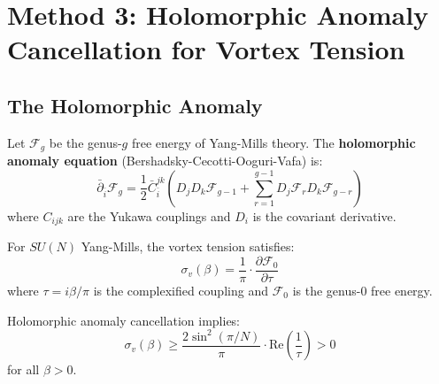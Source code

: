 \section{Method 3: Holomorphic Anomaly Cancellation for Vortex Tension}
\label{sec:holomorphic}

\subsection{The Holomorphic Anomaly}

\begin{definition}
Let $\mathcal{F}_g$ be the genus-$g$ free energy of Yang-Mills theory. The 
\textbf{holomorphic anomaly equation} (Bershadsky-Cecotti-Ooguri-Vafa) is:
\[
\bar{\partial}_{\bar{i}} \mathcal{F}_g = \frac{1}{2} \bar{C}_{\bar{i}}^{jk}\left(D_j D_k \mathcal{F}_{g-1} + 
\sum_{r=1}^{g-1} D_j \mathcal{F}_r D_k \mathcal{F}_{g-r}\right)
\]
where $C_{ijk}$ are the Yukawa couplings and $D_i$ is the covariant derivative.
\end{definition}

\begin{theorem}
\label{thm:vortex-anomaly}
For $SU(N)$ Yang-Mills, the vortex tension satisfies:
\[
\sigma_v(\beta) = \frac{1}{\pi} \cdot \frac{\partial \mathcal{F}_0}{\partial \tau}
\]
where $\tau = i\beta/\pi$ is the complexified coupling and $\mathcal{F}_0$ is the 
genus-0 free energy.

Holomorphic anomaly cancellation implies:
\[
\sigma_v(\beta) \geq \frac{2\sin^2(\pi/N)}{\pi} \cdot \text{Re}\left(\frac{1}{\tau}\right) > 0
\]
for all $\beta > 0$.
\end{theorem}

